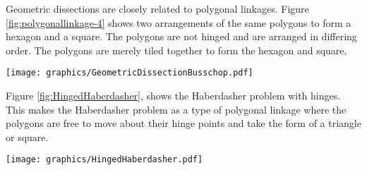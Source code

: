 \documentclass[10pt]{CSUNthesis}
\theoremstyle{plain}%
\theoremstyle{definition}
\theoremstyle{remark}
\begin{document}
Geometric dissections are closely related to polygonal linkages.  
Figure \ref{fig:polygonallinkage-4} shows two arrangements of the same polygons to form a hexagon and a square. 
The polygons are not hinged and are arranged in differing order.
The polygons are merely tiled together to form the hexagon and square. 

\begin{minipage}{\linewidth}\begin{center}
\texttt{[image: graphics/GeometricDissectionBusschop.pdf]}
\end{center}
\label{fig:polygonallinkage-4}
\end{minipage}

Figure \ref{fig:HingedHaberdasher}, shows the Haberdasher problem with hinges.  
This makes the Haberdasher problem as a type of polygonal linkage where the polygons are free to move about their hinge points and take the form of a triangle or square.  

\begin{minipage}{\linewidth}
\begin{center}
\texttt{[image: graphics/HingedHaberdasher.pdf]}
\end{center}
\label{fig:HingedHaberdasher}
\end{minipage}




\end{document}
